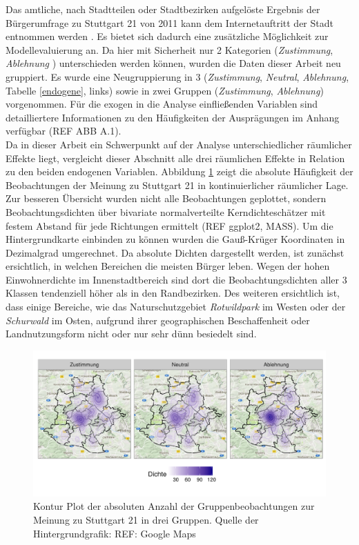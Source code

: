 \documentclass{Vorlage}
\begin{document}
Das amtliche, nach Stadtteilen oder Stadtbezirken aufgelöste Ergebnis der Bürgerumfrage zu Stuttgart 21 von 2011 kann dem Internetauftritt der Stadt entnommen werden \cite{Amt}. Es bietet sich dadurch eine zusätzliche Möglichkeit zur Modellevaluierung an. Da hier mit Sicherheit nur 2 Kategorien (\textit{Zustimmung}, \textit{Ablehnung }) unterschieden werden können, wurden  die Daten dieser Arbeit neu gruppiert. Es wurde eine Neugruppierung in 3 (\textit{Zustimmung}, \textit{Neutral}, \textit{Ablehnung}, Tabelle \ref{endogene}, links) sowie in zwei Gruppen (\textit{Zustimmung}, \textit{Ablehnung}) vorgenommen. Für die exogen in die Analyse einfließenden Variablen sind detailliertere Informationen zu den Häufigkeiten der Ausprägungen im Anhang verfügbar (REF ABB A.1).\\
Da in dieser Arbeit ein Schwerpunkt auf der Analyse unterschiedlicher räumlicher Effekte liegt, vergleicht dieser Abschnitt alle drei räumlichen Effekte in Relation zu den beiden endogenen Variablen. Abbildung \ref{XYStuttgart3} zeigt die absolute Häufigkeit der Beobachtungen der Meinung zu Stuttgart 21 in kontinuierlicher räumlicher Lage. Zur besseren Übersicht wurden nicht alle Beobachtungen geplottet, sondern Beobachtungsdichten über bivariate normalverteilte Kerndichteschätzer mit festem Abstand für jede Richtungen ermittelt (REF ggplot2, MASS). Um die Hintergrundkarte einbinden zu können wurden die Gauß-Krüger Koordinaten in Dezimalgrad umgerechnet. Da absolute Dichten dargestellt werden, ist zunächst ersichtlich, in welchen Bereichen die meisten Bürger leben. Wegen der hohen Einwohnerdichte im Innenstadtbereich sind dort die Beobachtungsdichten aller 3 Klassen tendenziell höher als in den Randbezirken. Des weiteren ersichtlich ist, dass einige Bereiche, wie das Naturschutzgebiet \textit{Rotwildpark} im Westen oder der \textit{Schurwald} im Osten, aufgrund ihrer geographischen Beschaffenheit oder Landnutzungsform nicht oder nur sehr dünn besiedelt sind.

\begin{figure}[h]
 \begin{center}
 \includegraphics[scale=0.8]{Pictures/XYStuttgart3.png}
 \caption{Kontur Plot der absoluten Anzahl der Gruppenbeobachtungen zur Meinung zu Stuttgart 21 in drei Gruppen. Quelle der Hintergrundgrafik: REF: Google Maps}
 \label{XYStuttgart3}
 \end{center}
\end{figure}
\end{document}
